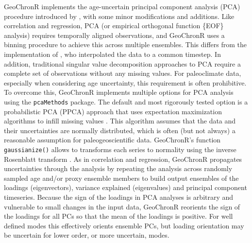 \documentclass[gchron, manuscript]{copernicus}
\begin{document}
GeoChronR implements the age-uncertain principal component analysis (PCA) procedure introduced by \citet{anchukaitis2013mceof}, with some minor modifications and additions.
Like correlation and regression, PCA (or empirical orthogonal function \{EOF\} analysis) requires temporally aligned observations, and GeoChronR uses a binning procedure to achieve this across multiple ensembles.
This differs from the implementation of \citet{anchukaitis2013mceof}, who interpolated the data to a common timestep.
In addition, traditional singular value decomposition approaches to PCA require a complete set of observations without any missing values.
For paleoclimate data, especially when considering age uncertainty, this requirement is often prohibitive.
To overcome this, GeoChronR implements multiple options for PCA analysis using the \texttt{pcaMethods} package.
The default and most rigorously tested option is a probabilistic PCA (PPCA) approach that uses expectation maximization algorithms to infill missing values \citep{roweis1998algorithms}.
This algorithm assumes that the data and their uncertainties are normally distributed, which is often (but not always) a reasonable assumption for paleogeoscientific data. GeoChronR's function \texttt{gaussianize()} allows to transforms each series to normality using the inverse Rosenblatt transform \citep{vanAlbada2007}.
As in correlation and regression, GeoChronR propagates uncertainties through the analysis by repeating the analysis across randomly sampled age and/or proxy ensemble members to build output ensembles of the loadings (eigenvectors), variance explained (eigenvalues) and principal component timeseries.
Because the sign of the loadings in PCA analyses is arbitrary and vulnerable to small changes in the input data, GeoChronR reorients the sign of the loadings for all PCs so that the mean of the loadings is positive.
For well defined modes this effectively orients ensemble PCs, but loading orientation may be uncertain for lower order, or more uncertain, modes.
\end{document}
